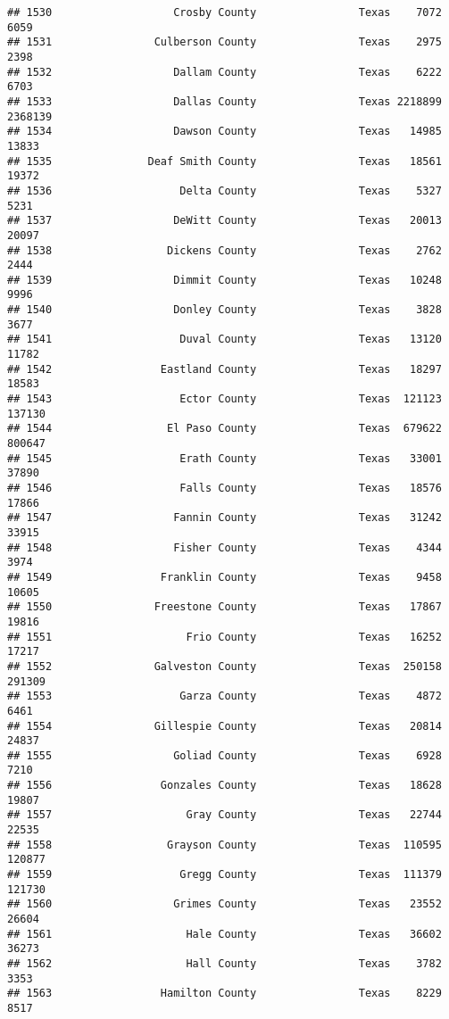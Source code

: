 \documentclass[
]{article}
\begin{document}
\begin{verbatim}
## 1530                   Crosby County                Texas    7072    6059
## 1531                Culberson County                Texas    2975    2398
## 1532                   Dallam County                Texas    6222    6703
## 1533                   Dallas County                Texas 2218899 2368139
## 1534                   Dawson County                Texas   14985   13833
## 1535               Deaf Smith County                Texas   18561   19372
## 1536                    Delta County                Texas    5327    5231
## 1537                   DeWitt County                Texas   20013   20097
## 1538                  Dickens County                Texas    2762    2444
## 1539                   Dimmit County                Texas   10248    9996
## 1540                   Donley County                Texas    3828    3677
## 1541                    Duval County                Texas   13120   11782
## 1542                 Eastland County                Texas   18297   18583
## 1543                    Ector County                Texas  121123  137130
## 1544                  El Paso County                Texas  679622  800647
## 1545                    Erath County                Texas   33001   37890
## 1546                    Falls County                Texas   18576   17866
## 1547                   Fannin County                Texas   31242   33915
## 1548                   Fisher County                Texas    4344    3974
## 1549                 Franklin County                Texas    9458   10605
## 1550                Freestone County                Texas   17867   19816
## 1551                     Frio County                Texas   16252   17217
## 1552                Galveston County                Texas  250158  291309
## 1553                    Garza County                Texas    4872    6461
## 1554                Gillespie County                Texas   20814   24837
## 1555                   Goliad County                Texas    6928    7210
## 1556                 Gonzales County                Texas   18628   19807
## 1557                     Gray County                Texas   22744   22535
## 1558                  Grayson County                Texas  110595  120877
## 1559                    Gregg County                Texas  111379  121730
## 1560                   Grimes County                Texas   23552   26604
## 1561                     Hale County                Texas   36602   36273
## 1562                     Hall County                Texas    3782    3353
## 1563                 Hamilton County                Texas    8229    8517

\end{verbatim}
\end{document}
